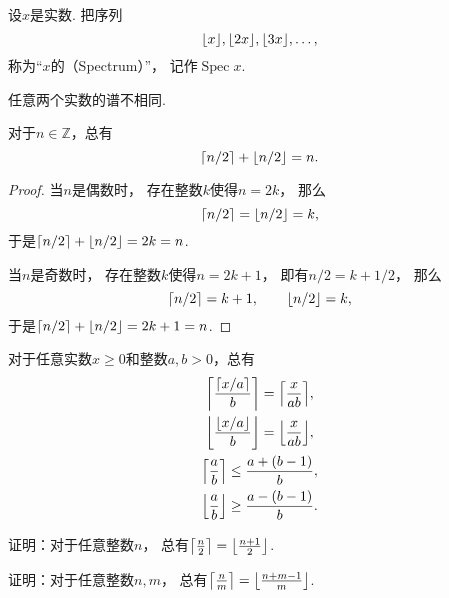 \begin{definition}
设\(x\)是实数.
把序列\begin{equation*}
	\floor{x},
	\floor{2x},
	\floor{3x},
	\dotsc,
\end{equation*}
称为“\(x\)的（Spectrum）”，
记作\(\operatorname{Spec} x\).
\end{definition}
\begin{proposition}
任意两个实数的谱不相同.
\end{proposition}

\begin{property}
对于\(n\in\mathbb{Z}\)，总有\begin{equation}
	\ceil{n/2} + \floor{n/2} = n.
\end{equation}
\begin{proof}
当\(n\)是偶数时，
存在整数\(k\)使得\(n=2k\)，
那么\begin{equation*}
	\ceil{n/2} = \floor{n/2} = k,
\end{equation*}
于是\(\ceil{n/2} + \floor{n/2} = 2k = n\).

当\(n\)是奇数时，
存在整数\(k\)使得\(n=2k+1\)，
即有\(n/2 = k + 1/2\)，
那么\begin{equation*}
	\ceil{n/2} = k+1,
	\qquad
	\floor{n/2} = k,
\end{equation*}
于是\(\ceil{n/2} + \floor{n/2} = 2k+1 = n\).
\end{proof}
\end{property}

\begin{property}
对于任意实数\(x \geq 0\)和整数\(a,b>0\)，总有\begin{gather}
	\ceil*{\frac{\ceil{x/a}}{b}} = \ceil*{\frac{x}{ab}}, \\
	\floor*{\frac{\floor{x/a}}{b}} = \floor*{\frac{x}{ab}}, \\
	\ceil*{\frac{a}{b}} \leq \frac{a+(b-1)}{b}, \\
	\floor*{\frac{a}{b}} \geq \frac{a-(b-1)}{b}.
\end{gather}
\end{property}

\begin{example}
证明：对于任意整数\(n\)，
总有\(\ceil*{\frac{n}2\vphantom{\frac12}} = \floor*{\frac{n+1}2}\).
\end{example}
\begin{example}
证明：对于任意整数\(n,m\)，
总有\(\ceil*{\frac{n}{m}\vphantom{\frac12}} = \floor*{\frac{n+m-1}{m}}\).
\end{example}
